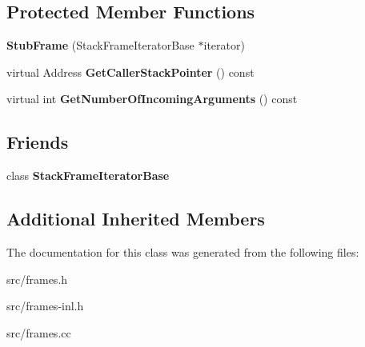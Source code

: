 \subsection*{Protected Member Functions}
\begin{DoxyCompactItemize}
\item 
\hypertarget{classv8_1_1internal_1_1_stub_frame_af20ec1c34864746407ce4748856a4d66}{}{\bfseries Stub\+Frame} (Stack\+Frame\+Iterator\+Base $\ast$iterator)\label{classv8_1_1internal_1_1_stub_frame_af20ec1c34864746407ce4748856a4d66}

\item 
\hypertarget{classv8_1_1internal_1_1_stub_frame_a279688e5c471f0b7e15a3d88347caea0}{}virtual Address {\bfseries Get\+Caller\+Stack\+Pointer} () const \label{classv8_1_1internal_1_1_stub_frame_a279688e5c471f0b7e15a3d88347caea0}

\item 
\hypertarget{classv8_1_1internal_1_1_stub_frame_acb6d45ab626884ee0980379533f6bf3c}{}virtual int {\bfseries Get\+Number\+Of\+Incoming\+Arguments} () const \label{classv8_1_1internal_1_1_stub_frame_acb6d45ab626884ee0980379533f6bf3c}

\end{DoxyCompactItemize}
\subsection*{Friends}
\begin{DoxyCompactItemize}
\item 
\hypertarget{classv8_1_1internal_1_1_stub_frame_ac7310421866976ca454bbe11c5f926c3}{}class {\bfseries Stack\+Frame\+Iterator\+Base}\label{classv8_1_1internal_1_1_stub_frame_ac7310421866976ca454bbe11c5f926c3}

\end{DoxyCompactItemize}
\subsection*{Additional Inherited Members}


The documentation for this class was generated from the following files\+:\begin{DoxyCompactItemize}
\item 
src/frames.\+h\item 
src/frames-\/inl.\+h\item 
src/frames.\+cc\end{DoxyCompactItemize}

